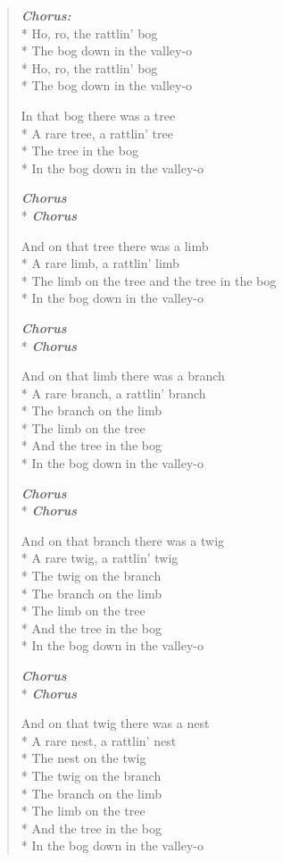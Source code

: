 \documentclass[9pt,twoside]{extarticle}
\makeatletter
\newenvironment{xverse}{
	\begin{verse}
	\fontsize{8.5}{10.5}\selectfont
}{
	\end{verse}
}
\newcommand{\chorusdef}{\textbf{\emph{Chorus:}}\\*}
\newcommand{\chorus@mark}[1][1]{%
\textbf{\emph{Chorus \ifthenelse{\equal{#1}{1}}{}{$\times$ #1}}}%
}
\newcommand{\chorusmark}[1][1]{%
\ifvmode%
\vspace{-0.5\stanzaskip}%
\chorus@mark[#1]%
\vspace{-0.5\stanzaskip}%
\else \\*%
\chorus@mark[#1]%
\fi%
}
\makeatother
\begin{document}
\begin{xverse}
\chorusdef
Ho, ro, the rattlin’ bog \\*
The bog down in the valley-o \\*
Ho, ro, the rattlin’ bog \\*
The bog down in the valley-o

In that bog there was a tree \\*
A rare tree, a rattlin’ tree \\*
The tree in the bog \\*
In the bog down in the valley-o

\chorusmark

And on that tree there was a limb \\*
A rare limb, a rattlin’ limb \\*
The limb on the tree and the tree in the bog \\*
In the bog down in the valley-o

\chorusmark

And on that limb there was a branch \\*
A rare branch, a rattlin’ branch \\*
The branch on the limb \\*
The limb on the tree \\*
And the tree in the bog \\*
In the bog down in the valley-o

\chorusmark

And on that branch there was a twig \\*
A rare twig, a rattlin’ twig \\*
The twig on the branch \\*
The branch on the limb \\*
The limb on the tree \\*
And the tree in the bog \\*
In the bog down in the valley-o

\chorusmark

And on that twig there was a nest \\*
A rare nest, a rattlin’ nest \\*
The nest on the twig \\*
The twig on the branch \\*
The branch on the limb \\*
The limb on the tree \\*
And the tree in the bog \\*
In the bog down in the valley-o


\end{xverse}
\end{document}
